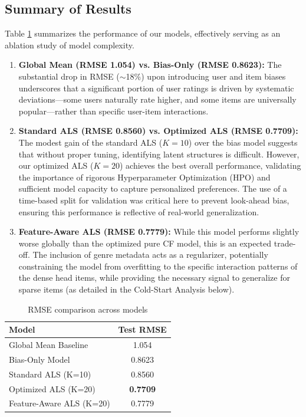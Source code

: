 \documentclass{article}
\theoremstyle{plain}
\theoremstyle{definition}
\theoremstyle{remark}
\begin{document}
\subsection{Summary of Results}

Table \ref{tab:results} summarizes the performance of our models, effectively serving as an ablation study of model complexity. 

\begin{enumerate}
    \item \textbf{Global Mean (RMSE 1.054) vs. Bias-Only (RMSE 0.8623):} The substantial drop in RMSE ($\sim$18\%) upon introducing user and item biases underscores that a significant portion of user ratings is driven by systematic deviations—some users naturally rate higher, and some items are universally popular—rather than specific user-item interactions.
    
    \item \textbf{Standard ALS (RMSE 0.8560) vs. Optimized ALS (RMSE 0.7709):} The modest gain of the standard ALS ($K=10$) over the bias model suggests that without proper tuning, identifying latent structures is difficult. However, our optimized ALS ($K=20$) achieves the best overall performance, validating the importance of rigorous Hyperparameter Optimization (HPO) and sufficient model capacity to capture personalized preferences. The use of a time-based split for validation was critical here to prevent look-ahead bias, ensuring this performance is reflective of real-world generalization.

    \item \textbf{Feature-Aware ALS (RMSE 0.7779):} While this model performs slightly worse globally than the optimized pure CF model, this is an expected trade-off. The inclusion of genre metadata acts as a regularizer, potentially constraining the model from overfitting to the specific interaction patterns of the dense head items, while providing the necessary signal to generalize for sparse items (as detailed in the Cold-Start Analysis below).
\end{enumerate}

\begin{table}[h]
\caption{RMSE comparison across models}
\centering
\begin{tabular}{lc}
\toprule
Model & Test RMSE \\
\midrule
Global Mean Baseline & 1.054 \\
Bias-Only Model & 0.8623 \\
Standard ALS (K=10) & 0.8560 \\
Optimized ALS (K=20) & \textbf{0.7709} \\
Feature-Aware ALS (K=20) & 0.7779 \\
\bottomrule
\end{tabular}
\label{tab:results}
\end{table}
\end{document}
